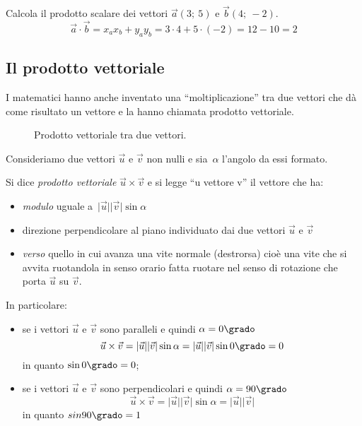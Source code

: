  \begin{esempio}
  Calcola il prodotto scalare dei vettori $\vec{a}(3;~5)$ e $\vec{b}(4;~-2)$.
\[\vec{a} \cdot \vec{b} = x_a x_b + y_a y_b = 3 \cdot 4 + 5 \cdot (-2)= 
  12-10 = 2\]
 \end{esempio}

\subsection{Il prodotto vettoriale}

I matematici hanno anche inventato una ``moltiplicazione'' tra due vettori che
dà come risultato un vettore e la hanno chiamata prodotto vettoriale.


\begin{inaccessibleblock}
 \begin{figure}[h]
 \centering
  
 \caption{Prodotto vettoriale tra due vettori.}
 \label{fig:vett_prodotto_vettoriale}
\end{figure}
\end{inaccessibleblock}

Consideriamo due vettori $\vec{u}$ e $\vec{v}$ non nulli e 
sia~$\alpha$ l'angolo da essi formato.

\begin{definizione}
 Si dice \emph{prodotto vettoriale} $\vec{u} \times \vec{v}$
 e si legge ``u vettore v'' il vettore che ha: 
 \begin{itemize}
  \item \emph{modulo} uguale 
   a~$\lvert\vec{u}\rvert\lvert\vec{v}\rvert \sin \alpha$
  \item direzione perpendicolare al piano individuato dai due 
   vettori $\vec{u}$ e $\vec{v}$
  \item \emph{verso} quello in cui avanza una vite normale (destrorsa) 
   cioè una vite che si avvita ruotandola in senso orario
   fatta ruotare nel senso di rotazione che porta $\vec{u}$ su $\vec{v}$.
 \end{itemize}
\end{definizione}
 
In particolare:
\begin{itemize}
 \item se i vettori $\vec{u}$ e $\vec{v}$ sono paralleli e 
  quindi $\alpha=0\grado$
  \[\vec{u} \times \vec{v} = \lvert\vec{u}\rvert\lvert\vec{v}\rvert \sin \alpha=
    \lvert\vec{u}\rvert\lvert\vec{v}\rvert \sin 0\grado=0\] 
  in quanto $\sin 0\grado = 0$;
 \item se i vettori $\vec{u}$ e $\vec{v}$ sono perpendicolari e 
  quindi $\alpha=90\grado$
  \[\vec{u} \times \vec{v} = \lvert\vec{u}\rvert\lvert\vec{v}\rvert \sin \alpha=
    \lvert\vec{u}\rvert\lvert\vec{v}\rvert\]
  in quanto $sin 90\grado = 1$
\end{itemize}

